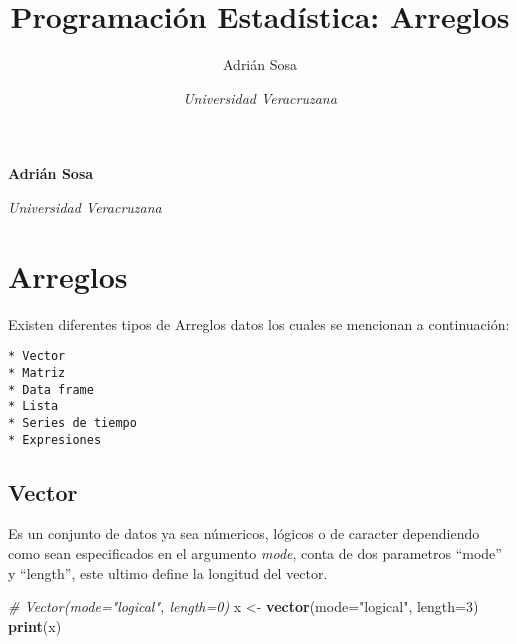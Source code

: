 \documentclass[11pt,]{article}
\title{Programación Estadística: Arreglos  }
\author{\Large Adrián Sosa\vspace{0.05in} \newline\normalsize\emph{}   \and \Large \vspace{0.05in} \newline\normalsize\emph{Universidad Veracruzana}  }
\date{}
\newcommand*{\authorfont}{\fontfamily{phv}\selectfont}
\newenvironment{Shaded}{\begin{snugshade}}{\end{snugshade}}
\newcommand{\CommentTok}[1]{\textcolor[rgb]{0.56,0.35,0.01}{\textit{#1}}}
\newcommand{\DataTypeTok}[1]{\textcolor[rgb]{0.13,0.29,0.53}{#1}}
\newcommand{\DecValTok}[1]{\textcolor[rgb]{0.00,0.00,0.81}{#1}}
\newcommand{\KeywordTok}[1]{\textcolor[rgb]{0.13,0.29,0.53}{\textbf{#1}}}
\newcommand{\NormalTok}[1]{#1}
\newcommand{\StringTok}[1]{\textcolor[rgb]{0.31,0.60,0.02}{#1}}
\begin{document}
	
%

{%
\setlength{\parindent}{0pt}
\thispagestyle{plain}
{\fontsize{18}{20}\selectfont\raggedright 
\maketitle  %

}

{
   \vskip 13.5pt\relax \normalsize\fontsize{11}{12} 
\textbf{\authorfont Adrián Sosa} \hskip 15pt \emph{\small }   \par \textbf{\authorfont } \hskip 15pt \emph{\small Universidad Veracruzana}   

}

}






\vskip -8.5pt



\noindent  

\hypertarget{arreglos}{%
\section{Arreglos}\label{arreglos}}

Existen diferentes tipos de Arreglos datos los cuales se mencionan a
continuación:

\begin{verbatim}
* Vector
* Matriz
* Data frame
* Lista
* Series de tiempo
* Expresiones
\end{verbatim}

\hypertarget{vector}{%
\subsection{Vector}\label{vector}}

Es un conjunto de datos ya sea númericos, lógicos o de caracter
dependiendo como sean especificados en el argumento \emph{mode}, conta
de dos parametros ``mode'' y ``length'', este ultimo define la longitud
del vector.

\begin{Shaded}
\begin{Highlighting}[]
\CommentTok{# Vector(mode="logical", length=0)}
\NormalTok{x <-}\StringTok{ }\KeywordTok{vector}\NormalTok{(}\DataTypeTok{mode=}\StringTok{"logical"}\NormalTok{, }\DataTypeTok{length=}\DecValTok{3}\NormalTok{)}
\KeywordTok{print}\NormalTok{(x)}
\end{Highlighting}
\end{Shaded}
\end{document}
